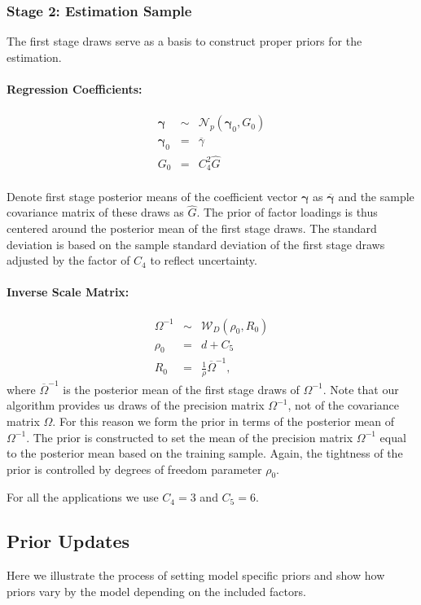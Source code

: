 \subsubsection{Stage 2: Estimation Sample}
The first stage draws serve as a basis to construct proper priors for the estimation.
\paragraph{Regression Coefficients:} 
\begin{eqnarray*}
	\boldsymbol{\gamma} &\sim& \mathcal{N}_{p}\left( \boldsymbol{\gamma}_{0},G_{0}\right) \\
	\boldsymbol{\gamma}_{0} &=& \overline{\gamma} \\ 
	G_{0} &=& C_{4}^{2} \widehat{G}
\end{eqnarray*}\\
Denote first stage posterior means of the coefficient vector $\boldsymbol{\gamma}$ as $\overline{\boldsymbol{\gamma}}$ and the sample covariance matrix of these draws as $\widehat{G}$.
The prior of factor loadings is thus centered around the posterior mean of the first stage draws. 
The standard deviation is based on the sample standard deviation of the first stage draws adjusted by the factor of $C_{4}$ to reflect uncertainty.
\paragraph{Inverse Scale Matrix:}
\begin{eqnarray*}
	\Omega^{-1} &\sim& \mathcal{W}_D\left(\rho_0, R_{0}\right) \\
	\rho_{0} &=& d + C_{5} \\ 
	R_{0} &=& \frac{1}{\rho} \overline{\Omega}^{-1},
\end{eqnarray*} 
where $\overline{\Omega}^{-1}$ is the posterior mean of the first stage draws of $\Omega^{-1}$.
Note that our algorithm provides us draws of the precision matrix $\Omega^{-1}$, not of the covariance matrix $\Omega$. 
For this reason we form the prior in terms of the posterior mean of ${\Omega}^{-1}$. 
The prior is constructed to set the mean of the precision matrix $\Omega^{-1}$ equal to the posterior mean based on the training sample. 
Again, the tightness of the prior is controlled by degrees of freedom parameter $\rho_{0}$. 

For all the applications we use $C_{4} = 3$ and $C_5 = 6$.

\subsection{Prior Updates}
Here we illustrate the process of setting model specific priors and show how priors vary by the model depending on the included factors.

